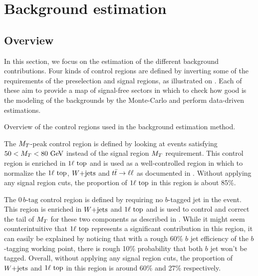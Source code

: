     \section{Background estimation \label{sec:analysis_backgroundEstimation}}

        \subsection{Overview}

    In this section, we focus on the estimation of the different background contributions.
    Four kinds of control regions are defined by inverting some of the requirements of the
    preselection and signal regions, as illustrated on .
    Each of these aim to provide a map of signal-free sectors in which to check how good is the
    modeling of the backgrounds by the Monte-Carlo and perform data-driven estimations.

                     {Overview of the control regions used in the background estimation method.}

    The $M_T$-peak control region is defined by looking at events satisfying $50 < M_T <
    80~\text{GeV}$ instead of the signal region $M_T$ requirement. This control region is enriched
    in $1\ell~\text{top}$ and is used as a well-controlled region in which to normalize the
    $1\ell~\text{top}$, $\text{$W$+jets}$ and $t\bar{t} \rightarrow \ell \ell$ as documented in .
    Without applying any signal region cuts, the proportion of $1\ell~\text{top}$ in this
    region is about 85\%.

    The $0\, b\text{-tag}$ control region is defined by requiring no $b$-tagged jet in the
    event. This region is enriched in $\text{$W$+jets}$ and $1\ell~\text{top}$ and is used to control
    and correct the tail of $M_T$ for these two components as described in .
    While it might seem counterintuitive that $1\ell~\text{top}$ represents a significant
    contribution in this region, it can easily be explained by noticing that with a rough
    60\% $b$ jet efficiency of the $b$-tagging working point, there is rough 10\% probability
    that both $b$ jet won't be tagged. Overall, without applying any signal region cuts,
    the proportion of $\text{$W$+jets}$ and $1\ell~\text{top}$ in this region is around 60\% and 27\%
    respectively.

